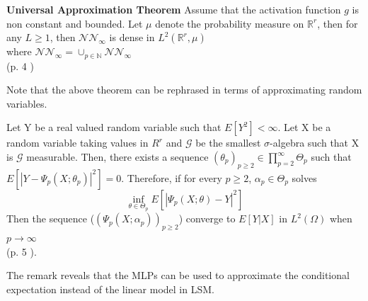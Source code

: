 \begin{theorem}\label{UniversalApproxTheorem}
\textbf{Universal Approximation Theorem} Assume that the activation function $g$ is non constant and bounded. Let $\mu$ denote the probability measure on $\mathbb{R}^r$, then for any $L\geq 1$, then $\mathcal{N} \mathcal{N}_\infty$ is dense in $L^2(\mathbb{R}^r, \mu)$\\
where $\mathcal{N} \mathcal{N}_\infty= \cup_{p\in \mathbb{N}} \mathcal{N} \mathcal{N}_\infty$\\
\null \hfill (p. 4 \parencite{Lelong19})
\end{theorem}
Note that the above theorem can be rephrased in terms of approximating random variables.
\begin{remark}
Let Y be a real valued random variable such that $E[Y^2]< \infty$. Let X be a random variable taking values in $R^r$ and $\mathcal{G}$ be the smallest $\sigma$-algebra such that X is $\mathcal{G}$ measurable. Then, there exists a sequence $(\theta_p)_{p\geq 2} \in \prod_{p=2}^{\infty} \Theta_{p}$ such that $E[|Y-\Psi_p(X;\theta_p)|^2]=0$. Therefore, if for every $p \geq 2$, $\alpha_p \in \Theta_p$ solves
$$\inf_{\theta\in \Theta_p} E[|\Psi_p(X;\theta)-Y|^2]$$
Then the sequence ($(\Psi_p(X;\alpha_p))_{p\geq 2}$) converge to $E[Y|X]$ in $L^2(\Omega)$ when $p \to \infty$ \\
\null \hfill (p. 5 \parencite{Lelong19}).
\end{remark}
The remark reveals that the MLPs can be used to approximate the conditional expectation instead of the linear model in LSM.

